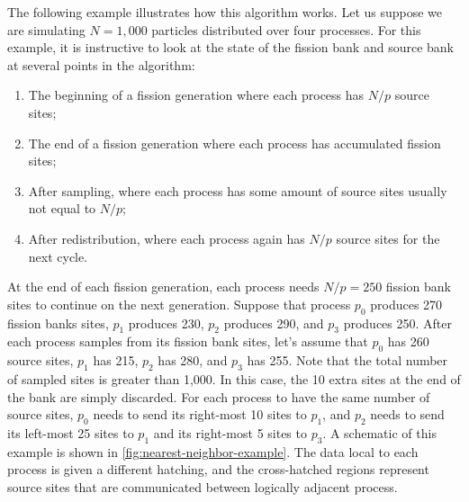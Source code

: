 The following example illustrates how this algorithm works. Let us suppose we
are simulating $N = 1,000$ particles distributed over four processes. For this
example, it is instructive to look at the state of the fission bank and source
bank at several points in the algorithm:
\begin{enumerate}
\item The beginning of a fission generation where each process has $N/p$ source
  sites;
\item The end of a fission generation where each process has accumulated fission
  sites;
\item After sampling, where each process has some amount of source sites usually
  not equal to $N/p$;
\item After redistribution, where each process again has $N/p$ source sites for
  the next cycle.
\end{enumerate}
At the end of each fission generation, each process needs $N/p = 250$ fission
bank sites to continue on the next generation. Suppose that process $p_0$
produces 270 fission banks sites, $p_1$ produces 230, $p_2$ produces 290, and
$p_3$ produces 250. After each process samples from its fission bank sites,
let's assume that $p_0$ has 260 source sites, $p_1$ has 215, $p_2$ has 280, and
$p_3$ has 255. Note that the total number of sampled sites is greater than
1,000. In this case, the 10 extra sites at the end of the bank are simply
discarded. For each process to have the same number of source sites, $p_0$ needs
to send its right-most 10 sites to $p_1$, and $p_2$ needs to send its left-most
25 sites to $p_1$ and its right-most 5 sites to $p_3$. A schematic of this
example is shown in \autoref{fig:nearest-neighbor-example}. The data local to
each process is given a different hatching, and the cross-hatched regions
represent source sites that are communicated between logically adjacent process.
